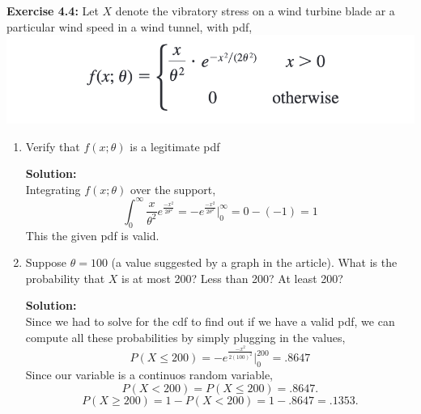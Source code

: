 \documentclass[12pt]{article}
\theoremstyle{homework}
\newcommand{\localhead}[1]{\par\smallskip\noindent\textbf{#1}\nobreak\\}%
\newcommand\solution{\localhead{Solution:}}
\begin{document}
\hspace{.5in}\textbf{Exercise 4.4:} Let $X$ denote the vibratory stress on a wind turbine
blade ar a particular wind speed in a wind tunnel, with pdf,
\center
\includegraphics[width = \textwidth]{pdf.png}
\center


\begin{enumerate}
  \item Verify that $f(x;\theta)$ is a legitimate pdf\\
  
  \solution Integrating $f(x;\theta)$ over the support,
  \begin{equation*}
    \int_{0}^{\infty} \dfrac{x}{\theta^2}e^{\frac{-x^2}{2\theta^2}} = -e^{\frac{-x^2}{2\theta^2}} |_{0}^{\infty} = 0-(-1) = 1
  \end{equation*}
  This the given pdf is valid. 
  \vspace{.25in}


  \item Suppose $\theta = 100 $ (a  value  suggested  by  a  graph  in  the article). What is the probability that $X$ is at most 200? Less than 200? At least 200?\\
  
  \solution
  Since we had to solve for the cdf to find out if we have a valid pdf, we can compute all these probabilities by simply plugging in the values,
  \begin{equation*}
    P(X \le 200) = -e^{\frac{-x^2}{2(100)^2}} |_{0}^{200} = .8647
  \end{equation*}
  Since our variable is a continuos random variable,
  \begin{equation*}
    P(X < 200) = P(X \le 200) =  .8647.
  \end{equation*}
  \begin{equation*}
    P(X \geq 200) = 1 -  P(X < 200) = 1 - .8647 = .1353.
  \end{equation*}

\end{enumerate}
\vspace{.5in}
\end{document}
